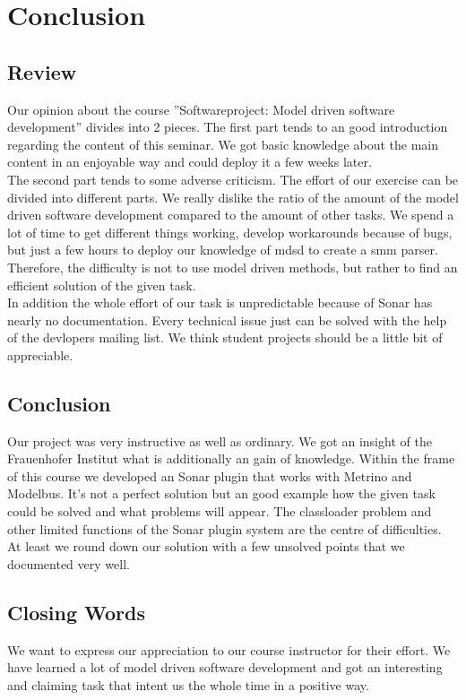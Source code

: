 \chapter{Conclusion}
\section{Review}
Our opinion about the course ''Softwareproject: Model driven software development'' divides into 2 pieces. The first part tends to an good introduction regarding the content of this seminar. We got basic knowledge about the main content in an enjoyable way and could deploy it a few weeks later. \\
The second part tends to some adverse criticism. The effort of our exercise can be divided into different parts. We really dislike the ratio of the amount of the model driven software development compared to the amount of other tasks. We spend a lot of time to get different things working, develop workarounds because of bugs, but just a few hours to deploy our knowledge of mdsd to create a smm parser. Therefore, the difficulty is not to use model driven methods, but rather to find an efficient solution of the given task. \\
In addition the whole effort of our task is unpredictable because of Sonar has nearly no documentation. Every technical issue just can be solved with the help of the devlopers mailing list. We think student projects should be a little bit of appreciable.

\section{Conclusion}
Our project was very instructive as well as ordinary. We got an insight of the Frauenhofer Institut what is additionally an gain of knowledge. Within the frame of this course we developed an Sonar plugin that works with Metrino and Modelbus. It's not a perfect solution but an good example how the given task could be solved and what problems will appear. The classloader problem and other limited functions of the Sonar plugin system are the centre of difficulties. At least we round down our solution with a few unsolved points that we documented very well. 

\section{Closing Words}
We want to express our appreciation to our course instructor for their effort. We have learned a lot of model driven software development and got an interesting and claiming task that intent us the whole time in a positive way.